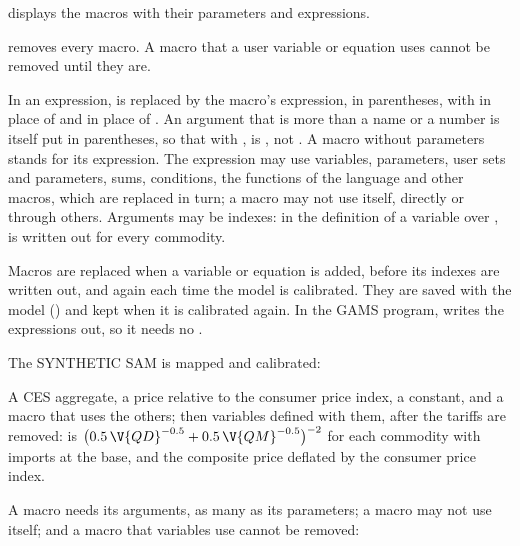 
\begin{optdesc}
\item[\opt{}{list}] displays the macros with their parameters and expressions.

\item[\opt{}{clear}] removes every macro. A macro that a user variable or
equation uses cannot be removed until they are.
\end{optdesc}


In an expression, \cmd{(}\cmd{,} \cmd{)} is replaced by
the macro's expression, in parentheses, with  in place of 
and  in place of . An argument that is more than a name or a
number is itself put in parentheses, so that with ,
 is , not
. A macro without parameters stands for its
expression. The expression may use variables, parameters, user sets and
parameters, sums, conditions, the functions of the language and other macros,
which are replaced in turn; a macro may not use itself, directly or through
others. Arguments may be indexes: in the definition of a variable over
,  is written out for every commodity.

Macros are replaced when a variable or equation is added, before its indexes
are written out, and again each time the model is calibrated. They are saved
with the model () and kept when it is calibrated again. In
the GAMS program,  writes the expressions out, so it needs no
.

The SYNTHETIC SAM is mapped and calibrated:


A CES aggregate, a price relative to the consumer price index, a constant,
and a macro that uses the others; then variables defined with them, after the
tariffs are removed:
 is $\big(0.5\,\V{QD}^{-0.5} + 0.5\,\V{QM}^{-0.5}\big)^{-2}$ for each
commodity with imports at the base, and  the composite price
deflated by the consumer price index.


A macro needs its arguments, as many as its parameters; a macro may not use
itself; and a macro that variables use cannot be removed:

